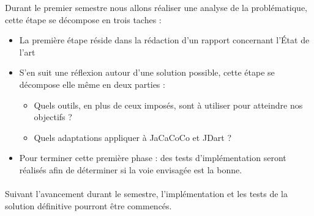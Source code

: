 
Durant le premier semestre nous allons réaliser une analyse de la problématique, cette étape se décompose en trois taches :
\begin{itemize}
	\item La première étape réside dans la rédaction d'un rapport concernant l'État de l'art
	\item S'en suit une réflexion autour d'une solution possible, cette étape se décompose elle même en deux parties :
		\begin{itemize}
		 \item Quels outils, en plus de ceux imposés, sont à utiliser pour atteindre nos objectifs ?
		 \item Quels adaptations appliquer à JaCaCoCo et JDart ?	
		\end{itemize}	
	\item Pour terminer cette première phase : des tests d'implémentation seront réalisés afin de déterminer si la voie envisagée est la bonne.
\end{itemize}
	
\paragraph{}
Suivant l'avancement durant le semestre, l'implémentation et les tests de la solution définitive pourront être commencés.